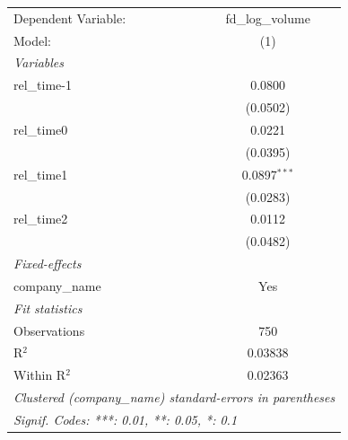 
\begingroup
\centering
\begin{tabular}{lc}
   \tabularnewline \midrule \midrule
   Dependent Variable: & fd\_log\_volume\\    
   Model:              & (1)\\  
   \midrule
   \emph{Variables}\\
   rel\_time-1         & 0.0800\\   
                       & (0.0502)\\   
   rel\_time0          & 0.0221\\   
                       & (0.0395)\\   
   rel\_time1          & 0.0897$^{***}$\\   
                       & (0.0283)\\   
   rel\_time2          & 0.0112\\   
                       & (0.0482)\\   
   \midrule
   \emph{Fixed-effects}\\
   company\_name       & Yes\\  
   \midrule
   \emph{Fit statistics}\\
   Observations        & 750\\  
   R$^2$               & 0.03838\\  
   Within R$^2$        & 0.02363\\  
   \midrule \midrule
   \multicolumn{2}{l}{\emph{Clustered (company\_name) standard-errors in parentheses}}\\
   \multicolumn{2}{l}{\emph{Signif. Codes: ***: 0.01, **: 0.05, *: 0.1}}\\
\end{tabular}
\par\endgroup



